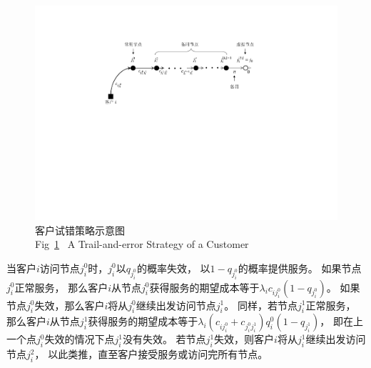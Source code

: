 \begin{figure}[ht] %
\setlength{\belowcaptionskip}{-0.5cm} 
  \centering
  \includegraphics[width=\textwidth
  ]{figures/试错策略示意图.pdf}
  \caption{客户试错策略示意图\\Fig~\ref{fig:trail}~ A Trail-and-error Strategy of a Customer}
  \label{fig:trail}
\end{figure}

当客户$i$访问节点$j_i^0$时，$j_i^0$以$q_{j_i^0}$的概率失效，
以$1-q_{j_i^0}$的概率提供服务。
如果节点$j_i^0$正常服务，
那么客户$i$从节点$j_i^0$获得服务的期望成本等于$\lambda_i c_{ij_i^0} (1-q_{j_i^0})$。
如果节点$j_i^0$失效，那么客户$i$将从$j_i^0$继续出发访问节点$j_i^1$。
同样，若节点$j_i^1$正常服务，
那么客户$i$从节点$j_i^1$获得服务的期望成本等于$\lambda_i (c_{ij_i^0}+c_{j_i^0j_i^1}) q_i^0(1-q_{j_i^1})$，
即在上一个点$j_i^0$失效的情况下点$j_i^1$没有失效。
若节点$j_i^1$失效，则客户$i$将从$j_i^1$继续出发访问节点$j_i^2$，
以此类推，直至客户接受服务或访问完所有节点。


